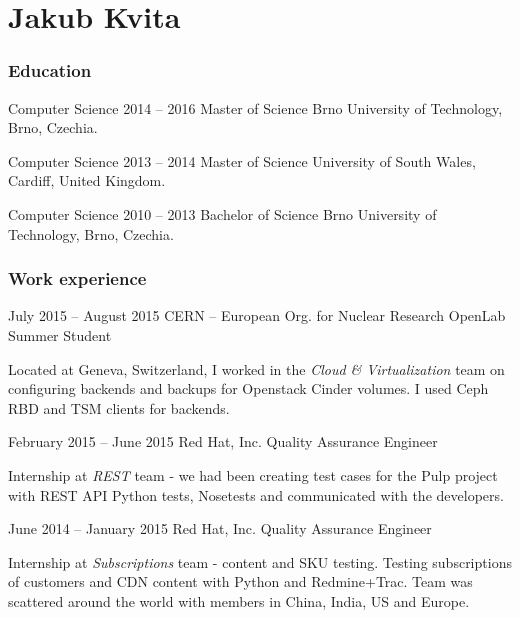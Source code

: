 \documentclass{tccv}
\begin{document}
\part{Jakub Kvita}

\section{Education}

\begin{yearlist}
	
	\item[Computer Science]{2014 -- 2016}
	{Master of Science}
	{Brno University of Technology, Brno, Czechia.}
	
	\item[Computer Science]{2013 -- 2014}
	{Master of Science}
	{University of South Wales, Cardiff, United Kingdom.}
	
	\item[Computer Science]{2010 -- 2013}
	{Bachelor of Science}
	{Brno University of Technology, Brno, Czechia.}
	
\end{yearlist}

\section{Work experience}

\begin{eventlist}

\item{July 2015 -- August 2015}
     {CERN -- European Org. for Nuclear Research}
     {OpenLab Summer Student}

Located at Geneva, Switzerland, I worked in the \emph{Cloud \& Virtualization} team on configuring backends and backups for Openstack Cinder volumes. I used Ceph RBD and TSM clients for backends.

\item{February 2015 -- June 2015}
     {Red Hat, Inc.}
     {Quality Assurance Engineer}

Internship at \emph{REST} team -  we had been creating test cases for the Pulp project with REST API Python tests, Nosetests and communicated with the developers.

\item{June 2014 -- January 2015}
     {Red Hat, Inc.}
     {Quality Assurance Engineer}

Internship at \emph{Subscriptions} team - content and SKU testing. Testing subscriptions of customers and CDN content with Python and Redmine+Trac. Team was scattered around the world with members in China, India, US and Europe.

\end{eventlist}
\end{document}
